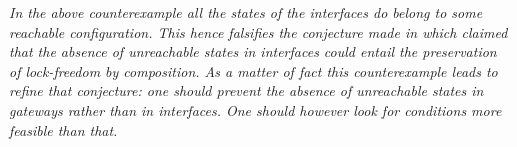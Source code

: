 \smallskip
\begin{remark}
{\em
In the above counterexample all the states of the interfaces do belong to some reachable configuration.
This hence falsifies the conjecture made in \cite{BH24} which claimed that  the absence of unreachable states in interfaces could entail the preservation of lock-freedom by composition. 
As a matter of fact this counterexample leads to refine that conjecture: one should prevent
the absence of unreachable states in gateways rather than in interfaces.
One should however look for conditions more feasible than that.
}\finex
\end{remark}







 














 
 
 

